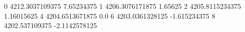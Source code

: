 0 4212.3037109375 7.65234375
1 4206.3076171875 1.65625
2 4205.8115234375 1.16015625
4 4204.6513671875 0.0
6 4203.0361328125 -1.615234375
8 4202.537109375 -2.1142578125
